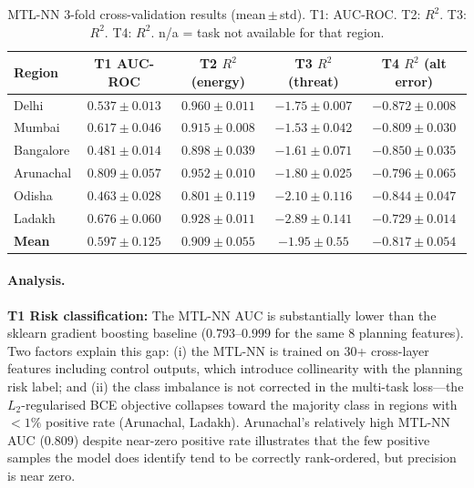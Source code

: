 \documentclass{article}
\begin{document}
\begin{table}[h]
\centering
\caption{MTL-NN 3-fold cross-validation results (mean\,$\pm$\,std). T1: AUC-ROC.
T2: $R^2$. T3: $R^2$. T4: $R^2$. n/a = task not available for that region.}
\label{tab:nn_results}
\small
\begin{tabular}{lcccc}
\toprule
Region & T1 AUC-ROC & T2 $R^2$ (energy) & T3 $R^2$ (threat) & T4 $R^2$ (alt error) \\
\midrule
Delhi      & $0.537 \pm 0.013$ & $\mathbf{0.960 \pm 0.011}$ & $-1.75 \pm 0.007$ & $-0.872 \pm 0.008$ \\
Mumbai     & $0.617 \pm 0.046$ & $\mathbf{0.915 \pm 0.008}$ & $-1.53 \pm 0.042$ & $-0.809 \pm 0.030$ \\
Bangalore  & $0.481 \pm 0.014$ & $\mathbf{0.898 \pm 0.039}$ & $-1.61 \pm 0.071$ & $-0.850 \pm 0.035$ \\
Arunachal  & $0.809 \pm 0.057$ & $\mathbf{0.952 \pm 0.010}$ & $-1.80 \pm 0.025$ & $-0.796 \pm 0.065$ \\
Odisha     & $0.463 \pm 0.028$ & $\mathbf{0.801 \pm 0.119}$ & $-2.10 \pm 0.116$ & $-0.844 \pm 0.047$ \\
Ladakh     & $0.676 \pm 0.060$ & $\mathbf{0.928 \pm 0.011}$ & $-2.89 \pm 0.141$ & $-0.729 \pm 0.014$ \\
\midrule
\textbf{Mean} & $0.597 \pm 0.125$ & $\mathbf{0.909 \pm 0.055}$ & $-1.95 \pm 0.55$ & $-0.817 \pm 0.054$ \\
\bottomrule
\end{tabular}
\end{table}

\paragraph{Analysis.}
\textbf{T1 Risk classification:} The MTL-NN AUC is substantially lower than
the sklearn gradient boosting baseline ($0.793$--$0.999$ for the same 8 planning
features). Two factors explain this gap: (i) the MTL-NN is trained on 30+
cross-layer features including control outputs, which introduce collinearity
with the planning risk label; and (ii) the class imbalance is not corrected
in the multi-task loss---the $L_2$-regularised BCE objective collapses
toward the majority class in regions with $<1\%$ positive rate (Arunachal, Ladakh).
Arunachal's relatively high MTL-NN AUC ($0.809$) despite near-zero positive rate
illustrates that the few positive samples the model does identify tend to
be correctly rank-ordered, but precision is near zero.
\end{document}
